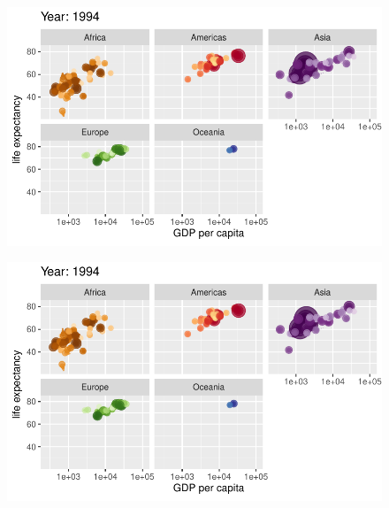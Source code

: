 \documentclass[
  letterpaper,
  DIV=11,
  numbers=noendperiod]{scrartcl}
\begin{document}
\begin{figure}[H]

{\centering \includegraphics{class05_files/figure-pdf/unnamed-chunk-24-76.pdf}

}

\end{figure}

\begin{figure}[H]

{\centering \includegraphics{class05_files/figure-pdf/unnamed-chunk-24-77.pdf}

}

\end{figure}
\end{document}

